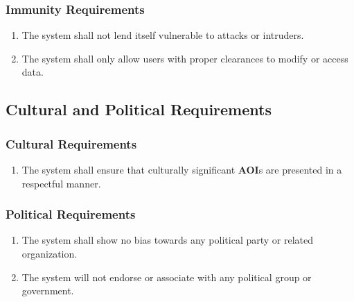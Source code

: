 \documentclass[titlepage]{article}
\newcounter{req}
\begin{document}
		\subsubsection{Immunity Requirements}
		\label{ssub:immunity_requirements}
		\begin{enumerate}[{SR}1. ]
		\setcounter{enumi}{\value{req}}
			\item 
			The system shall not lend itself vulnerable to attacks or intruders.
			\item
			The system shall only allow users with proper clearances to modify or access data.
		\setcounter{req}{\theenumi}
		\end{enumerate}
		
		
		\subsection{Cultural and Political Requirements}
		\setcounter{req}{0}
		\label{sub:cultural_and_political_requirements}
		
		\subsubsection{Cultural Requirements}
		\label{ssub:cultural_requirements}
		\begin{enumerate}[{CP}1. ]
		\setcounter{enumi}{\value{req}}
			\item
			The system shall ensure that culturally significant \textbf{AOI}s are presented in a respectful manner.
		\setcounter{req}{\theenumi}
		\end{enumerate}
		
		\subsubsection{Political Requirements}
		\label{ssub:political_requirements}
		\begin{enumerate}[{CP}1. ]
		\setcounter{enumi}{\value{req}}
			\item
			The system shall show no bias towards any political party or related organization.
			\item
			The system will not endorse or associate with any political group or government.
		\setcounter{req}{\theenumi}
		\end{enumerate}
		
\end{document}
